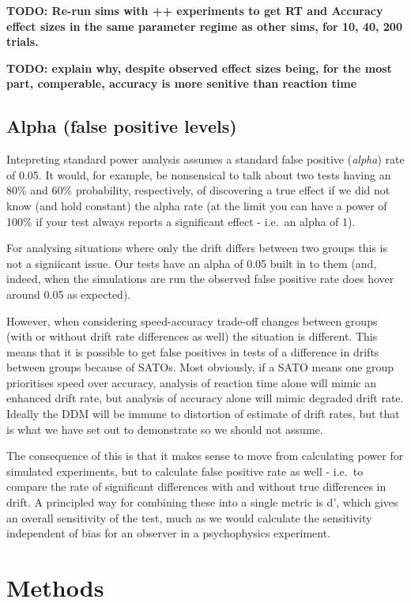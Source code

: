 \documentclass[floatsintext,doc]{apa6}
\theoremstyle{definition}
\theoremstyle{definition}
\theoremstyle{definition}
\theoremstyle{remark}
\begin{document}
\textbf{TODO: Re-run sims with ++ experiments to get RT and Accuracy
effect sizes in the same parameter regime as other sims, for 10, 40, 200
trials.}

\textbf{TODO: explain why, despite observed effect sizes being, for the
most part, comperable, accuracy is more senitive than reaction time}

\subsection{Alpha (false positive
levels)}\label{alpha-false-positive-levels}

Intepreting standard power analysis assumes a standard false positive
(\emph{alpha}) rate of 0.05. It would, for example, be nonsensical to
talk about two tests having an 80\% and 60\% probability, respectively,
of discovering a true effect if we did not know (and hold constant) the
alpha rate (at the limit you can have a power of 100\% if your test
always reports a significant effect - i.e.~an alpha of 1).

For analysing situations where only the drift differs between two groups
this is not a signiicant issue. Our tests have an alpha of 0.05 built in
to them (and, indeed, when the simulations are run the observed false
positive rate does hover around 0.05 as expected).

However, when considering speed-accuracy trade-off changes between
groups (with or without drift rate differences as well) the situation is
different. This means that it is possible to get false positives in
tests of a difference in drifts between groups because of SATOs. Most
obviously, if a SATO means one group prioritises speed over accuracy,
analysis of reaction time alone will mimic an enhanced drift rate, but
analysis of accuracy alone will mimic degraded drift rate. Ideally the
DDM will be immune to distortion of estimate of drift rates, but that is
what we have set out to demonstrate so we should not assume.

The consequence of this is that it makes sense to move from calculating
power for simulated experiments, but to calculate false positive rate as
well - i.e.~to compare the rate of significant differences with and
without true differences in drift. A principled way for combining these
into a single metric is d', which gives an overall sensitivity of the
test, much as we would calculate the sensitivity independent of bias for
an observer in a psychophysics experiment.

\section{Methods}\label{methods}
\end{document}
